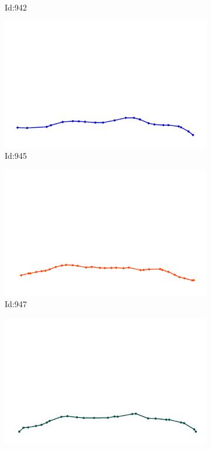 \documentclass[12pt,twoside]{report}
\begin{document}
\begin{figure}
\begin{subfigure}[b]{0.20\textwidth}
\caption{Id:942}
\end{subfigure}
\begin{subfigure}[b]{0.20\textwidth}
\centering
\includegraphics[width=\textwidth]{../trajectories/945.png}
\caption{Id:945}
\end{subfigure}
\begin{subfigure}[b]{0.20\textwidth}
\centering
\includegraphics[width=\textwidth]{../trajectories/947.png}
\caption{Id:947}
\end{subfigure}
\begin{subfigure}[b]{0.20\textwidth}
\centering
\includegraphics[width=\textwidth]{../trajectories/951.png}

\end{subfigure}
\end{figure}
\end{document}
